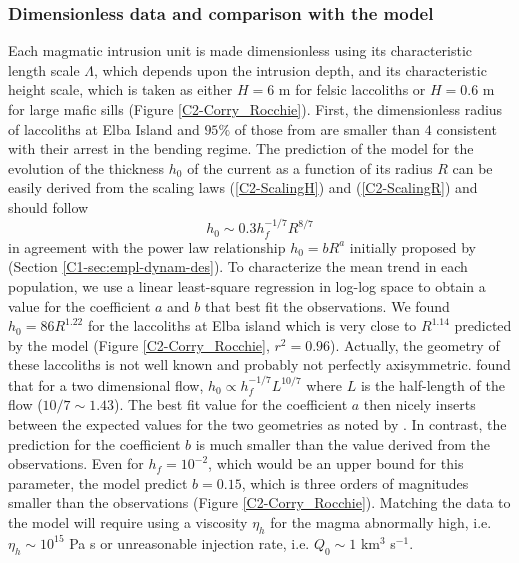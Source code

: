 \subsubsection*{Dimensionless  data  and  comparison  with  the
  model}


Each  magmatic   intrusion  unit  is  made   dimensionless  using  its
characteristic  length   scale  $\Lambda$,  which  depends   upon  the
intrusion depth, and  its characteristic height scale,  which is taken
as either $H=6$  m for felsic laccoliths or $H=0.6$  m for large mafic
sills  (Figure  \ref{C2-Corry_Rocchie}).    First,  the  dimensionless
radius  of  laccoliths  at  Elba  Island  and  $95\%$  of  those  from
\citet{E:2015tl} are smaller than $4$  consistent with their arrest in
the bending regime.  The prediction of  the model for the evolution of
the thickness $h_0$ of the current as a function of its radius $R$ can
be  easily  derived  from  the scaling  laws  (\ref{C2-ScalingH})  and
(\ref{C2-ScalingR}) and should follow
\begin{equation}
  h_0 \sim 0.3h_f^{-1/7} R^{8/7}\label{C2-Hr}
\end{equation}
in agreement  with the power  law relationship $h_0 =  bR^a$ initially
proposed         by          \citet{McCaffrey:1997ea}         (Section
\ref{C1-sec:empl-dynam-des}).  To characterize the  mean trend in each
population, we use  a linear least-square regression  in log-log space
to obtain a  value for the coefficient  $a$ and $b$ that  best fit the
observations.  We found $h_0 = 86 R^{1.22}$ for the laccoliths at Elba
island  which is  very  close  to $R^{1.14}$  predicted  by the  model
(Figure \ref{C2-Corry_Rocchie},  $r^2=0.96$).  Actually,  the geometry
of  these laccoliths  is not  well  known and  probably not  perfectly
axisymmetric.   \citet{Anonymous:QWXp_4JV}   found  that  for   a  two
dimensional  flow, $h_0\propto  h_f^{-1/7}L^{10/7}$ where  $L$ is  the
half-length of the flow ($10/7\sim 1.43$).  The best fit value for the
coefficient $a$  then nicely inserts  between the expected  values for
the two  geometries as noted by  \citet{Michaut:2011kg}.  In contrast,
the prediction for the coefficient $b$  is much smaller than the value
derived from the observations.  Even for $h_f=10^{-2}$, which would be
an upper bound  for this parameter, the model  predict $b=0.15$, which
is three  orders of magnitudes  smaller than the  observations (Figure
\ref{C2-Corry_Rocchie}).  Matching the data  to the model will require
using  a  viscosity  $\eta_h$  for the  magma  abnormally  high,  i.e.
$\eta_h   \sim  10^{15}$   Pa  s   or  unreasonable   injection  rate,
i.e. $Q_0\sim 1$ km$^3$ s$^{-1}$.

